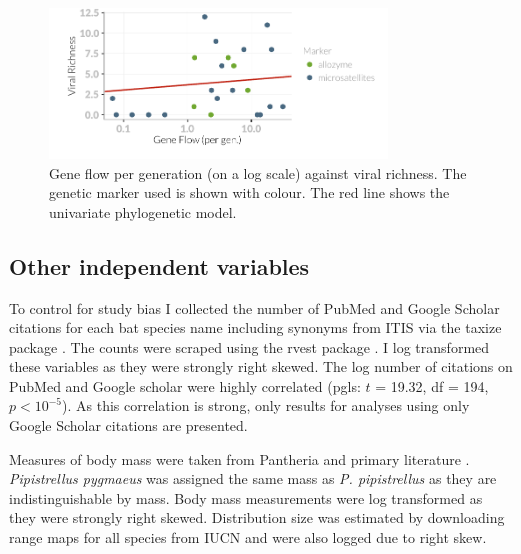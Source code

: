\begin{knitrout}\footnotesize
{}\color{fgcolor}\begin{figure}[t]

{\centering \includegraphics[width=0.8\textwidth]{figure/fstRawData-1} 

}

\caption[Gene flow per generation (on a log scale) against viral richness]{Gene flow per generation (on a log scale) against viral richness. The genetic marker used is shown with colour. The red line shows the univariate phylogenetic model.}\label{fig:fstRawData}
\end{figure}


\end{knitrout}

\subsection{Other independent variables}

To control for study bias I collected the number of PubMed and Google Scholar citations for each bat species name including synonyms from ITIS \cite{itis} via the taxize package \cite{chamberlain2013taxize}.
The counts were scraped using the rvest package \cite{rvest}.
I log transformed these variables as they were strongly right skewed.
The log number of citations on PubMed and Google scholar were highly correlated (pgls: $t$ = 19.32, df = 194, $p < 10^{-5}$).
As this correlation is strong, only results for analyses using only Google Scholar citations are presented.

Measures of body mass were taken from Pantheria \cite{jones2009pantheria} and primary literature \cite{canals2005relative, arita1993rarity, lopez2014echolocation, orr2013does, lim2001bat, aldridge1987turning, ma2003dietary, owen2003home, henderson2008movements, heaney2012nyctalus, oleksy2015high, zhang2009recent}. 
\emph{Pipistrellus pygmaeus} was assigned the same mass as \emph{P. pipistrellus} as they are indistinguishable by mass.
Body mass measurements were log transformed as they were strongly right skewed.
Distribution size was estimated by downloading range maps for all species from IUCN \cite{iucn} and were also logged due to right skew.



